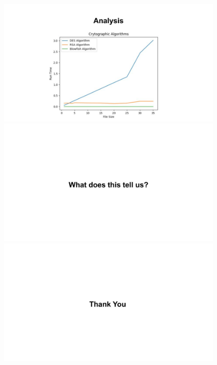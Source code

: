 \documentclass[a4paper]{beamer}
\begin{document}
\includegraphics[width=11cm]{images/Prez_13.jpg}
\includegraphics[width=11cm]{images/Prez_14.jpg}
\includegraphics[width=11cm]{images/Prez_15.jpg}
\end{document}
